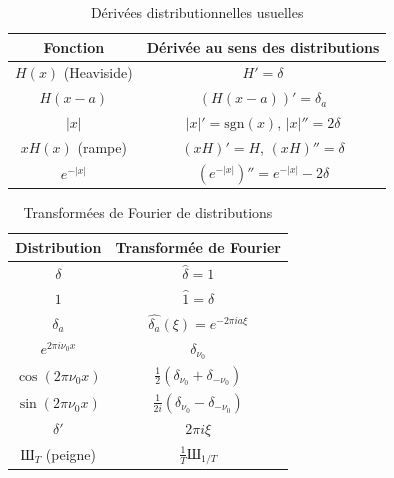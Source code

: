 \documentclass[11pt,a4paper]{report}
\newcommand{\Sha}{\text{Ш}} %
\begin{document}
\renewcommand{\arraystretch}{1.6}
\begin{table}[h!]
\centering
\begin{tabular}{|c|c|}
\hline
\textbf{Fonction} & \textbf{Dérivée au sens des distributions} \\
\hline\hline
$H(x)$ (Heaviside) & $H' = \delta$ \\
\hline
$H(x-a)$ & $(H(x-a))' = \delta_a$ \\
\hline
$|x|$ & $|x|' = \text{sgn}(x)$, \quad $|x|'' = 2\delta$ \\
\hline
$xH(x)$ (rampe) & $(xH)' = H$, \quad $(xH)'' = \delta$ \\
\hline
$e^{-|x|}$ & $(e^{-|x|})'' = e^{-|x|} - 2\delta$ \\
\hline
\end{tabular}
\caption{Dérivées distributionnelles usuelles}
\end{table}

\renewcommand{\arraystretch}{1.6}
\begin{table}[h!]
\centering
\begin{tabular}{|c|c|}
\hline
\textbf{Distribution} & \textbf{Transformée de Fourier} \\
\hline\hline
$\delta$ & $\hat{\delta} = 1$ \\
\hline
$1$ & $\hat{1} = \delta$ \\
\hline
$\delta_a$ & $\hat{\delta_a}(\xi) = e^{-2\pi i a \xi}$ \\
\hline
$e^{2\pi i \nu_0 x}$ & $\delta_{\nu_0}$ \\
\hline
$\cos(2\pi \nu_0 x)$ & $\frac{1}{2}(\delta_{\nu_0} + \delta_{-\nu_0})$ \\
\hline
$\sin(2\pi \nu_0 x)$ & $\frac{1}{2i}(\delta_{\nu_0} - \delta_{-\nu_0})$ \\
\hline
$\delta'$ & $2\pi i \xi$ \\
\hline
$\Sha_T$ (peigne) & $\frac{1}{T} \Sha_{1/T}$ \\
\hline
\end{tabular}
\caption{Transformées de Fourier de distributions}
\end{table}
\end{document}
